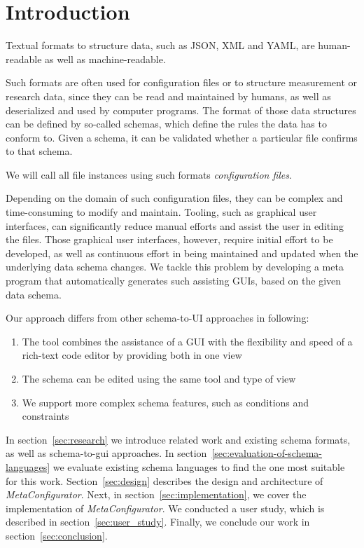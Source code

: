 \documentclass[lettersize,journal]{IEEEtran}
\newcommand{\cfgfiles}{configuration files}
\newcommand{\toolname}{\textit{MetaConfigurator}} %
\begin{document}
 \section{Introduction}\label{sec:introduction} %

 Textual formats to structure data, such as JSON, XML and YAML, are human-readable as well as machine-readable.

	
 Such formats are often used for configuration files or to structure measurement or research data, since they can be read and maintained by humans, as well as deserialized and used by computer programs.
 The format of those data structures can be defined by so-called schemas, which define the rules the data has to conform to.
 Given a schema, it can be validated whether a particular file confirms to that schema.

 We will call all file instances using such formats \textit{\cfgfiles}.

 Depending on the domain of such \cfgfiles, they can be complex and time-consuming to modify and maintain.
 Tooling, such as graphical user interfaces, can significantly reduce manual efforts and assist the user in editing the files.
 Those graphical user interfaces, however, require initial effort to be developed, as well as continuous effort in being maintained and updated when the underlying data schema changes.
 We tackle this problem by developing a meta program that automatically generates such assisting GUIs, based on the given data schema.

 Our approach differs from other schema-to-UI approaches in following:

 \begin{enumerate}
  \item The tool combines the assistance of a GUI with the flexibility and speed of a rich-text code editor by providing both in one view
  \item The schema can be edited using the same tool and type of view
  \item We support more complex schema features, such as conditions and constraints
 \end{enumerate}


 In section~\ref{sec:research} we introduce related work and existing schema formats, as well as schema-to-gui approaches.
 In section~\ref{sec:evaluation-of-schema-languages} we evaluate existing schema languages to find the one most suitable for this work.
 Section~\ref{sec:design} describes the design and architecture of \toolname{}.
 Next, in section~\ref{sec:implementation}, we cover the implementation of \toolname{}.
 We conducted a user study, which is described in section~\ref{sec:user_study}.
 Finally, we conclude our work in section~\ref{sec:conclusion}.
\end{document}
